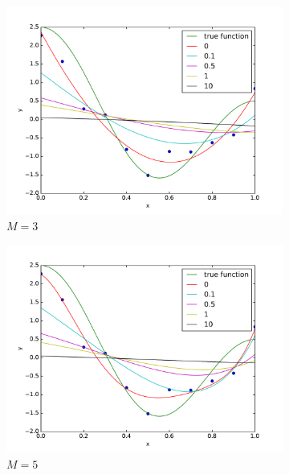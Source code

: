 \documentclass[10pt,psamsfonts]{amsart}
\theoremstyle{definition}
\theoremstyle{remark}
\numberwithin{equation}{section}
\begin{document}
\begin{figure}
	\centering
	\begin{subfigure}[b]{0.24\textwidth}
		\includegraphics[width=\textwidth]{hw1_3-1_3.pdf}
		\caption{$M=3$}
	\end{subfigure}
	\begin{subfigure}[b]{0.24\textwidth}
		\includegraphics[width=\textwidth]{hw1_3-1_5.pdf}
		\caption{$M=5$}
	\end{subfigure}
	\begin{subfigure}[b]{0.24\textwidth}

\end{subfigure}
\end{figure}
\end{document}
